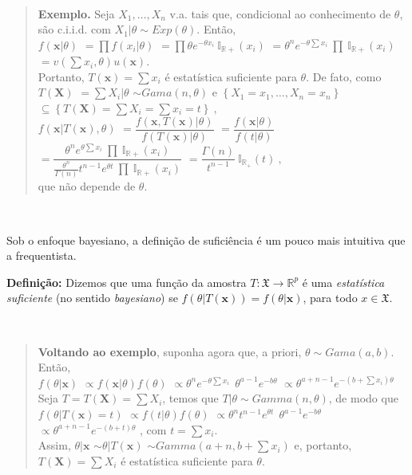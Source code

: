 \documentclass[
]{book}
\begin{document}
\(~\)

\begin{quote}
\textbf{Exemplo.} Seja \(X_1,\ldots,X_n\) v.a. tais que, condicional ao conhecimento de \(\theta\), são c.i.i.d. com \(X_1|\theta \sim Exp(\theta)\). Então,\\
\(f(\boldsymbol x|\theta)\) \(=\prod f(x_i|\theta)\) \(=\prod \theta e^{-\theta x_i} ~\mathbb{I}_{\mathbb{R+}}(x_i)\) \(=\theta^n e^{-\theta \sum x_i} ~\prod ~\mathbb{I}_{\mathbb{R+}}(x_i)\) \(= v\left(\sum x_i, \theta\right) u(\boldsymbol x)\).\\
Portanto, \(T(\boldsymbol x) = \sum x_i\) é estatística suficiente para \(\theta\). De fato, como \(T(\boldsymbol X)\) \(= \sum X_i | \theta\) \(\sim Gama(n,\theta)\) e \(\left\{X_1=x_1,\ldots,X_n=x_n\right\}\) \(\subseteq \left\{T(\boldsymbol X) = \sum X_i = \sum x_i = t\right\}~,\)\\
\(f\left(\boldsymbol x| T(\boldsymbol x),\theta\right)\) \(=\dfrac{f\left(\boldsymbol{x},T(\boldsymbol{x})|\theta\right)}{f\left(T(\boldsymbol{x})|\theta\right)}\) \(=\dfrac{f\left(\boldsymbol{x}|\theta\right)}{f\left(t|\theta\right)}\) \(=\dfrac{\theta^n e^{\theta \sum x_i} ~\prod ~\mathbb{I}_{\mathbb{R+}}(x_i)}{\frac{\theta^n}{\Gamma(n)}t^{n-1} e^{\theta t} ~\prod ~\mathbb{I}_{\mathbb{R+}}(x_i)}\) \(= \dfrac{\Gamma(n)}{t^{n-1}} ~\mathbb{I}_{\mathbb{R}_+}\left(t\right)~,\)\\
que não depende de \(\theta\).
\end{quote}

\(~\)

Sob o enfoque bayesiano, a definição de suficiência é um pouco mais intuitiva que a frequentista.

\textbf{Definição:} Dizemos que uma função da amostra \(T:\mathfrak{X} \rightarrow \mathbb{R}^p\) é uma \emph{estatística suficiente} (no sentido \emph{bayesiano}) se \(f\left(\theta | T(\boldsymbol x)\right) = f\left(\theta | \boldsymbol x\right)\), para todo \(x \in \mathfrak{X}\).

\(~\)

\begin{quote}
\textbf{Voltando ao exemplo}, suponha agora que, a priori, \(\theta \sim Gama(a,b)\). Então,\\
\(f(\theta| \boldsymbol x)\) \(\propto f(\boldsymbol x|\theta)f(\theta)\) \(\propto \theta^n e^{-\theta \sum x_i} ~~\theta^{a-1}e^{-b\theta}\) \(\propto \theta^{a+n-1} e^{-(b+\sum x_i)\theta}\)\\
Seja \(T = T(\boldsymbol X) = \sum X_i\), temos que \(T|\theta\sim Gamma(n,\theta)\), de modo que\\
\(f\left(\theta| T(\boldsymbol x)=t\right)\) \(\propto f(t|\theta)f(\theta)\) \(\propto \theta^n t^{n-1} e^{\theta t} ~~\theta^{a-1}e^{-b\theta}\) \(\propto \theta^{a+n-1} e^{-(b+t)\theta}\) , com \(t=\sum x_i\).\\
Assim, \(\theta|\boldsymbol x\) \(\sim \theta|T(\boldsymbol x)\) \(\sim Gamma\left(a+n,b+\sum x_i\right)\) e, portanto, \(T(\boldsymbol X) = \sum X_i\) é estatística suficiente para \(\theta\).
\end{quote}
\end{document}
